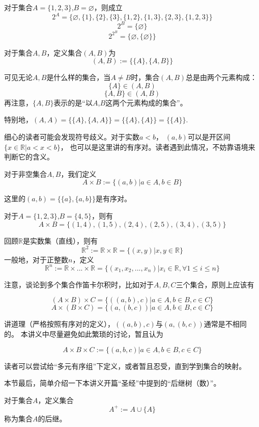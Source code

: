 \begin{example}对于集合$A=\{1,2,3\}$,$B=\varnothing$，则成立
$$2^A=\{\varnothing,\{1\},\{2\},\{3\},
\{1,2\},\{1,3\},\{2,3\},\{1,2,3\}\}$$
$$2^B=\{\varnothing\}$$
$$2^{2^B}=\{\varnothing,\{\varnothing\}\}$$
\end{example}

\begin{definition}[有序对]
对于集合$A,B$，定义集合$(A,B)$为
$$(A,B):=\{\{A\},\{A,B\}\}$$
\end{definition}
可见无论$A,B$是什么样的集合，当$A\neq B$时，集合$(A,B)$总是由两个元素构成：
$$\{A\}\in(A,B)$$
$$\{A,B\}\in(A,B)$$
再注意，$\{A,B\}$表示的是“以$A$,$B$这两个元素构成的集合”。

特别地，$(A,A)=\{\{A\},\{A,A\}\}=\{\{A\},\{A\}\}=\{\{A\}\}$.

细心的读者可能会发现符号歧义。对于实数$a<b$，
$(a,b)$可以是开区间$\{x\in\mathbb{R}|a<x<b\}$，
也可以是这里讲的有序对。读者遇到此情况，不妨靠语境来判断它的含义。


\begin{definition}[笛卡尔积]
对于非空集合$A,B$，我们定义
$$A\times B:=\{(a,b)|a\in A, b\in B\}$$
\end{definition}
这里的$(a,b)=\{\{a\},\{a,b\}\}$是有序对。

\begin{example}对于$A=\{1,2,3\}$,$B=\{4,5\}$，则有
$$A\times B=\{(1,4),(1,5),(2,4),(2,5),(3,4),(3,5)\}$$
\end{example}

\begin{example}[$n$维空间]
回顾$\mathbb{R}$是实数集（直线），则有
$$\mathbb{R}^2:=\mathbb{R}\times\mathbb{R}
=\{(x,y)|x,y\in\mathbb{R}\}$$
一般地，对于正整数$n$，定义
$$\mathbb{R}^n:=\mathbb{R}\times...\times\mathbb{R}
=\{(x_1,x_2,...,x_n)|x_i\in\mathbb{R},\forall 1\leq i\leq n\}$$
\end{example}
注意，谈论到多个集合作笛卡尔积时，比如对于$A,B,C$三个集合，原则上应该有

$$(A\times B)\times C=\{((a,b),c)|a\in A,b\in B, c\in C\}$$
$$A\times (B\times C)=\{(a,(b,c))|a\in A,b\in B, c\in C\}$$

讲道理（严格按照有序对的定义），$((a,b),c)$与$(a,(b,c))$通常是不相同的。
本讲义中尽量避免如此繁琐的讨论，暂且认为

$$A\times B\times C:=\{(a,b,c)|a\in A,b\in B, c\in C\}$$

读者可以尝试给“多元有序组”下定义，或者暂且忍受，直到学到集合的映射。\vs

本节最后，简单介绍一下本讲义开篇“圣经”中提到的“后继树（数）”。
\begin{definition}[后继]
对于集合$A$，定义集合
$$A^+:=A\cup\{A\}$$
称为集合$A$的后继。
\end{definition}

